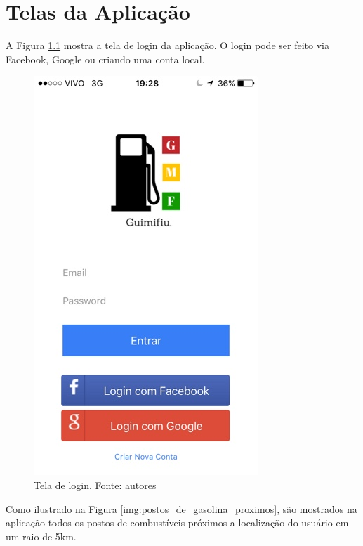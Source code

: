 
\chapter{Telas da Aplicação}
\label{chap:telas}

A Figura \ref{img:tela_de_login} mostra a tela de login da aplicação. O login pode ser feito via Facebook, Google ou criando uma conta local.

\begin{figure}[H]
    \centering
    \includegraphics[scale=0.5]{figuras/app_1.jpg}
    \caption[Tela de login]{Tela de login. Fonte: autores}
    \label{img:tela_de_login}
\end{figure}

Como ilustrado na Figura \ref{img:postos_de_gasolina_proximos}, são mostrados na aplicação todos os postos de combustíveis próximos a localização do usuário em um raio de 5km.

